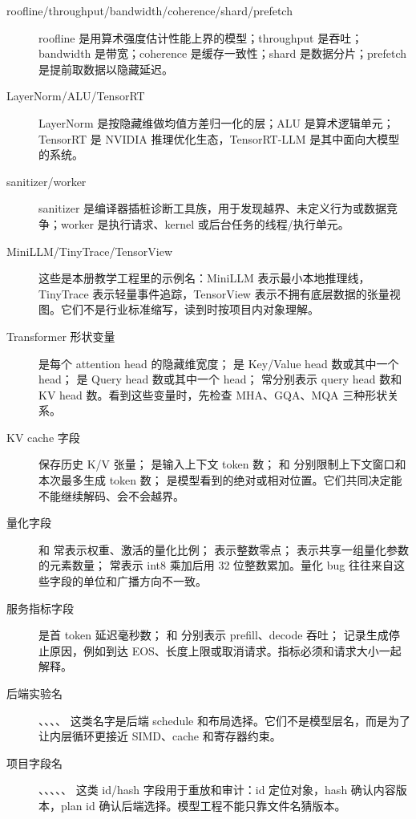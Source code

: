 \begin{description}
  \item[roofline/throughput/bandwidth/coherence/shard/prefetch] roofline 是用算术强度估计性能上界的模型；throughput 是吞吐；bandwidth 是带宽；coherence 是缓存一致性；shard 是数据分片；prefetch 是提前取数据以隐藏延迟。
  \item[LayerNorm/ALU/TensorRT] LayerNorm 是按隐藏维做均值方差归一化的层；ALU 是算术逻辑单元；TensorRT 是 NVIDIA 推理优化生态，TensorRT-LLM 是其中面向大模型的系统。
  \item[sanitizer/worker] sanitizer 是编译器插桩诊断工具族，用于发现越界、未定义行为或数据竞争；worker 是执行请求、kernel 或后台任务的线程/执行单元。
  \item[MiniLLM/TinyTrace/TensorView] 这些是本册教学工程里的示例名：MiniLLM 表示最小本地推理线，TinyTrace 表示轻量事件追踪，TensorView 表示不拥有底层数据的张量视图。它们不是行业标准缩写，读到时按项目内对象理解。
  \item[Transformer 形状变量]  是每个 attention head 的隐藏维宽度； 是 Key/Value head 数或其中一个 head； 是 Query head 数或其中一个 head； 常分别表示 query head 数和 KV head 数。看到这些变量时，先检查 MHA、GQA、MQA 三种形状关系。
  \item[KV cache 字段]  保存历史 K/V 张量； 是输入上下文 token 数； 和  分别限制上下文窗口和本次最多生成 token 数； 是模型看到的绝对或相对位置。它们共同决定能不能继续解码、会不会越界。
  \item[量化字段]  和  常表示权重、激活的量化比例； 表示整数零点； 表示共享一组量化参数的元素数量； 常表示 int8 乘加后用 32 位整数累加。量化 bug 往往来自这些字段的单位和广播方向不一致。
  \item[服务指标字段]  是首 token 延迟毫秒数； 和  分别表示 prefill、decode 吞吐； 记录生成停止原因，例如到达 EOS、长度上限或取消请求。指标必须和请求大小一起解释。
  \item[后端实验名] 、、、、 这类名字是后端 schedule 和布局选择。它们不是模型层名，而是为了让内层循环更接近 SIMD、cache 和寄存器约束。
  \item[项目字段名] 、、、、、 这类 id/hash 字段用于重放和审计：id 定位对象，hash 确认内容版本，plan id 确认后端选择。模型工程不能只靠文件名猜版本。

\end{description}
